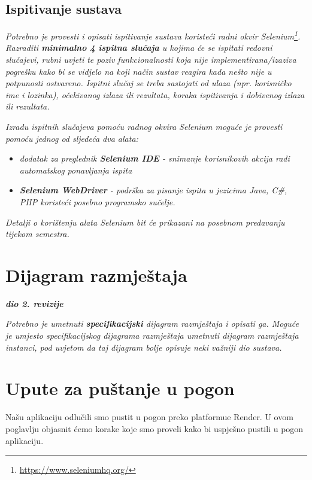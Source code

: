 			\subsection{Ispitivanje sustava}
			
			 \textit{Potrebno je provesti i opisati ispitivanje sustava koristeći radni okvir Selenium\footnote{\url{https://www.seleniumhq.org/}}. Razraditi \textbf{minimalno 4 ispitna slučaja} u kojima će se ispitati redovni slučajevi, rubni uvjeti te poziv funkcionalnosti koja nije implementirana/izaziva pogrešku kako bi se vidjelo na koji način sustav reagira kada nešto nije u potpunosti ostvareno. Ispitni slučaj se treba sastojati od ulaza (npr. korisničko ime i lozinka), očekivanog izlaza ili rezultata, koraka ispitivanja i dobivenog izlaza ili rezultata.\\ }
			 
			 \textit{Izradu ispitnih slučajeva pomoću radnog okvira Selenium moguće je provesti pomoću jednog od sljedeća dva alata:}
			 \begin{itemize}
			 	\item \textit{dodatak za preglednik \textbf{Selenium IDE} - snimanje korisnikovih akcija radi automatskog ponavljanja ispita	}
			 	\item \textit{\textbf{Selenium WebDriver} - podrška za pisanje ispita u jezicima Java, C\#, PHP koristeći posebno programsko sučelje.}
			 \end{itemize}
		 	\textit{Detalji o korištenju alata Selenium bit će prikazani na posebnom predavanju tijekom semestra.}
			
			\eject 
		
		
		\section{Dijagram razmještaja}
			
			\textbf{\textit{dio 2. revizije}}
			
			 \textit{Potrebno je umetnuti \textbf{specifikacijski} dijagram razmještaja i opisati ga. Moguće je umjesto specifikacijskog dijagrama razmještaja umetnuti dijagram razmještaja instanci, pod uvjetom da taj dijagram bolje opisuje neki važniji dio sustava.}
			
			\eject 
		
		\section{Upute za puštanje u pogon}
		\indent Našu aplikaciju odlučili smo pustit u pogon preko platformue Render. U ovom poglavlju objasnit ćemo korake koje smo proveli kako bi uspješno pustili u pogon aplikaciju.\newline
	
